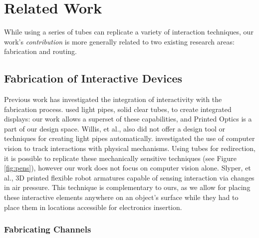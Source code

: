 \section{Related Work}

While using a series of tubes can replicate a variety of interaction techniques, our work's \emph{contribution} is more generally related to two existing research areas: fabrication and routing.

\subsection{Fabrication of Interactive Devices}

Previous work has investigated the integration of interactivity with the fabrication process.  \cite{Willis-printedoptics} used light pipes, solid clear tubes, to create integrated displays: our work allows a superset of these capabilities, and Printed Optics is a part of our design space.  Willis, et al., also did not offer a design tool or techniques for creating light pipes automatically.  \cite{Savage-sauron} investigated the use of computer vision to track interactions with physical mechanisms.  Using tubes for redirection, it is possible to replicate these mechanically sensitive techniques (see Figure \ref{fig:pens}), however our work does not focus on computer vision alone.  Slyper, et al., \cite{Slyper-pressure} 3D printed flexible robot armatures capable of sensing interaction via changes in air pressure.  This technique is complementary to ours, as we allow for placing these interactive elements anywhere on an object's surface while they had to place them in locations accessible for electronics insertion.

\subsubsection{Fabricating Channels}

